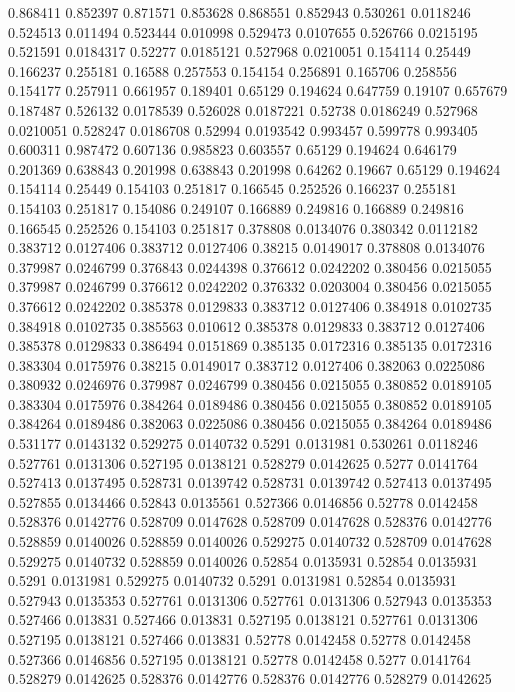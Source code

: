 0.868411 0.852397
0.871571 0.853628
0.868551 0.852943
0.530261 0.0118246
0.524513 0.011494
0.523444 0.010998
0.529473 0.0107655
0.526766 0.0215195
0.521591 0.0184317
0.52277 0.0185121
0.527968 0.0210051
0.154114 0.25449
0.166237 0.255181
0.16588 0.257553
0.154154 0.256891
0.165706 0.258556
0.154177 0.257911
0.661957 0.189401
0.65129 0.194624
0.647759 0.19107
0.657679 0.187487
0.526132 0.0178539
0.526028 0.0187221
0.52738 0.0186249
0.527968 0.0210051
0.528247 0.0186708
0.52994 0.0193542
0.993457 0.599778
0.993405 0.600311
0.987472 0.607136
0.985823 0.603557
0.65129 0.194624
0.646179 0.201369
0.638843 0.201998
0.638843 0.201998
0.64262 0.19667
0.65129 0.194624
0.154114 0.25449
0.154103 0.251817
0.166545 0.252526
0.166237 0.255181
0.154103 0.251817
0.154086 0.249107
0.166889 0.249816
0.166889 0.249816
0.166545 0.252526
0.154103 0.251817
0.378808 0.0134076
0.380342 0.0112182
0.383712 0.0127406
0.383712 0.0127406
0.38215 0.0149017
0.378808 0.0134076
0.379987 0.0246799
0.376843 0.0244398
0.376612 0.0242202
0.380456 0.0215055
0.379987 0.0246799
0.376612 0.0242202
0.376332 0.0203004
0.380456 0.0215055
0.376612 0.0242202
0.385378 0.0129833
0.383712 0.0127406
0.384918 0.0102735
0.384918 0.0102735
0.385563 0.010612
0.385378 0.0129833
0.383712 0.0127406
0.385378 0.0129833
0.386494 0.0151869
0.385135 0.0172316
0.385135 0.0172316
0.383304 0.0175976
0.38215 0.0149017
0.383712 0.0127406
0.382063 0.0225086
0.380932 0.0246976
0.379987 0.0246799
0.380456 0.0215055
0.380852 0.0189105
0.383304 0.0175976
0.384264 0.0189486
0.380456 0.0215055
0.380852 0.0189105
0.384264 0.0189486
0.382063 0.0225086
0.380456 0.0215055
0.384264 0.0189486
0.531177 0.0143132
0.529275 0.0140732
0.5291 0.0131981
0.530261 0.0118246
0.527761 0.0131306
0.527195 0.0138121
0.528279 0.0142625
0.5277 0.0141764
0.527413 0.0137495
0.528731 0.0139742
0.528731 0.0139742
0.527413 0.0137495
0.527855 0.0134466
0.52843 0.0135561
0.527366 0.0146856
0.52778 0.0142458
0.528376 0.0142776
0.528709 0.0147628
0.528709 0.0147628
0.528376 0.0142776
0.528859 0.0140026
0.528859 0.0140026
0.529275 0.0140732
0.528709 0.0147628
0.529275 0.0140732
0.528859 0.0140026
0.52854 0.0135931
0.52854 0.0135931
0.5291 0.0131981
0.529275 0.0140732
0.5291 0.0131981
0.52854 0.0135931
0.527943 0.0135353
0.527761 0.0131306
0.527761 0.0131306
0.527943 0.0135353
0.527466 0.013831
0.527466 0.013831
0.527195 0.0138121
0.527761 0.0131306
0.527195 0.0138121
0.527466 0.013831
0.52778 0.0142458
0.52778 0.0142458
0.527366 0.0146856
0.527195 0.0138121
0.52778 0.0142458
0.5277 0.0141764
0.528279 0.0142625
0.528376 0.0142776
0.528376 0.0142776
0.528279 0.0142625
